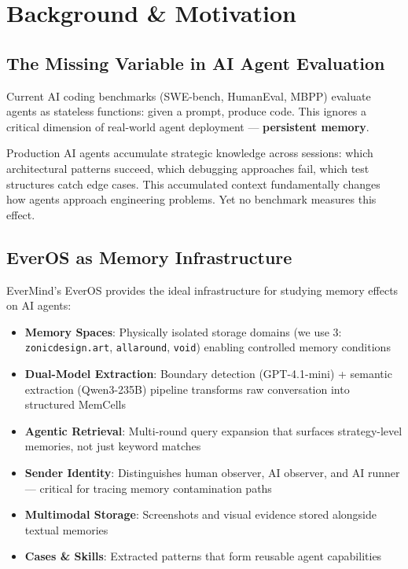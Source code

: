 \documentclass[11pt, a4paper]{article}
\begin{document}
\clearpage
\tableofcontents
\clearpage

\section{Background \& Motivation}

\subsection{The Missing Variable in AI Agent Evaluation}

Current AI coding benchmarks (SWE-bench, HumanEval, MBPP) evaluate agents as stateless functions: given a prompt, produce code. This ignores a critical dimension of real-world agent deployment --- \textbf{persistent memory}.

Production AI agents accumulate strategic knowledge across sessions: which architectural patterns succeed, which debugging approaches fail, which test structures catch edge cases. This accumulated context fundamentally changes how agents approach engineering problems. Yet no benchmark measures this effect.

\subsection{EverOS as Memory Infrastructure}

EverMind's EverOS provides the ideal infrastructure for studying memory effects on AI agents:

\begin{itemize}
  \item \textbf{Memory Spaces}: Physically isolated storage domains (we use 3: \texttt{zonicdesign.art}, \texttt{allaround}, \texttt{void}) enabling controlled memory conditions
  \item \textbf{Dual-Model Extraction}: Boundary detection (GPT-4.1-mini) + semantic extraction (Qwen3-235B) pipeline transforms raw conversation into structured MemCells
  \item \textbf{Agentic Retrieval}: Multi-round query expansion that surfaces strategy-level memories, not just keyword matches
  \item \textbf{Sender Identity}: Distinguishes human observer, AI observer, and AI runner --- critical for tracing memory contamination paths
  \item \textbf{Multimodal Storage}: Screenshots and visual evidence stored alongside textual memories
  \item \textbf{Cases \& Skills}: Extracted patterns that form reusable agent capabilities
\end{itemize}
\end{document}
